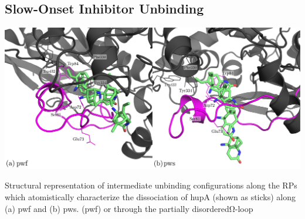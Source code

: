 \documentclass[a0,portrait]{a0poster}
\begin{document}
\begin{multicols}{2}
\section*{\huge\centering\color{myblue}Slow-Onset Inhibitor Unbinding}
\vspace*{1cm}
\begin{minipage}[b]{\linewidth}
  \centering
  \includegraphics[width=38cm]{../fig/fig_6.pdf}
\end{minipage}

\noindent Structural representation of intermediate unbinding configurations along the RPs
which atomistically characterize the dissociation of hupA (shown as sticks)
along (a) pwf and (b) pws.  (pwf) or through the partially disorderedΩ-loop


\end{multicols}
\end{document}
